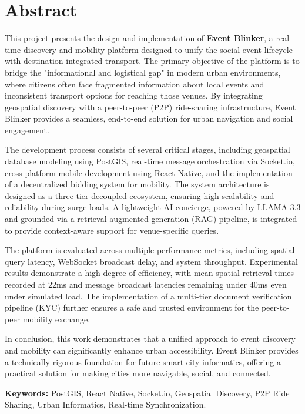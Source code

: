 \documentclass[12pt]{report}
\begin{document}
\newpage
\chapter*{Abstract}
This project presents the design and implementation of \textbf{Event Blinker}, a real-time discovery and mobility platform designed to unify the social event lifecycle with destination-integrated transport. The primary objective of the platform is to bridge the "informational and logistical gap" in modern urban environments, where citizens often face fragmented information about local events and inconsistent transport options for reaching those venues. By integrating geospatial discovery with a peer-to-peer (P2P) ride-sharing infrastructure, Event Blinker provides a seamless, end-to-end solution for urban navigation and social engagement.

The development process consists of several critical stages, including geospatial database modeling using PostGIS, real-time message orchestration via Socket.io, cross-platform mobile development using React Native, and the implementation of a decentralized bidding system for mobility. The system architecture is designed as a three-tier decoupled ecosystem, ensuring high scalability and reliability during surge loads. A lightweight AI concierge, powered by LLAMA 3.3 and grounded via a retrieval-augmented generation (RAG) pipeline, is integrated to provide context-aware support for venue-specific queries.

The platform is evaluated across multiple performance metrics, including spatial query latency, WebSocket broadcast delay, and system throughput. Experimental results demonstrate a high degree of efficiency, with mean spatial retrieval times recorded at 22ms and message broadcast latencies remaining under 40ms even under simulated load. The implementation of a multi-tier document verification pipeline (KYC) further ensures a safe and trusted environment for the peer-to-peer mobility exchange.

In conclusion, this work demonstrates that a unified approach to event discovery and mobility can significantly enhance urban accessibility. Event Blinker provides a technically rigorous foundation for future smart city informatics, offering a practical solution for making cities more navigable, social, and connected.

\vspace{1cm}
\noindent \textbf{Keywords:} PostGIS, React Native, Socket.io, Geospatial Discovery, P2P Ride Sharing, Urban Informatics, Real-time Synchronization.
\end{document}
